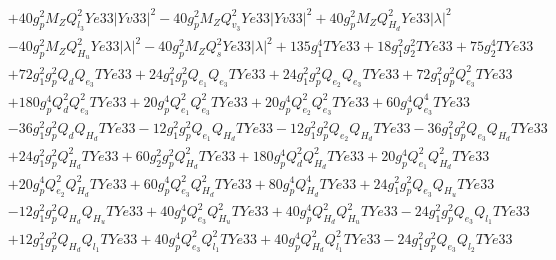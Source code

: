 \begin{align}
 &+40 g_{p}^{2} M_Z Q_{l_3}^{2} Ye33 |Yv33|^2 -40 g_{p}^{2} M_Z Q_{v_3}^{2} Ye33 |Yv33|^2 +40 g_{p}^{2} M_Z Q_{H_d}^{2} Ye33 |\lambda|^2 \nonumber \\ 
 &-40 g_{p}^{2} M_Z Q_{H_u}^{2} Ye33 |\lambda|^2 -40 g_{p}^{2} M_Z Q_{s}^{2} Ye33 |\lambda|^2 +135 g_{1}^{4} TYe33 +18 g_{1}^{2} g_{2}^{2} TYe33 +75 g_{2}^{4} TYe33 \nonumber \\ 
 &+72 g_{1}^{2} g_{p}^{2} Q_{d} Q_{e_3} TYe33 +24 g_{1}^{2} g_{p}^{2} Q_{e_{1}} Q_{e_3} TYe33 +24 g_{1}^{2} g_{p}^{2} Q_{e_{2}} Q_{e_3} TYe33 +72 g_{1}^{2} g_{p}^{2} Q_{e_3}^{2} TYe33 \nonumber \\ 
 &+180 g_{p}^{4} Q_{d}^{2} Q_{e_3}^{2} TYe33 +20 g_{p}^{4} Q_{e_{1}}^{2} Q_{e_3}^{2} TYe33 +20 g_{p}^{4} Q_{e_{2}}^{2} Q_{e_3}^{2} TYe33 +60 g_{p}^{4} Q_{e_3}^{4} TYe33 \nonumber \\ 
 &-36 g_{1}^{2} g_{p}^{2} Q_{d} Q_{H_d} TYe33 -12 g_{1}^{2} g_{p}^{2} Q_{e_{1}} Q_{H_d} TYe33 -12 g_{1}^{2} g_{p}^{2} Q_{e_{2}} Q_{H_d} TYe33 -36 g_{1}^{2} g_{p}^{2} Q_{e_3} Q_{H_d} TYe33 \nonumber \\ 
 &+24 g_{1}^{2} g_{p}^{2} Q_{H_d}^{2} TYe33 +60 g_{2}^{2} g_{p}^{2} Q_{H_d}^{2} TYe33 +180 g_{p}^{4} Q_{d}^{2} Q_{H_d}^{2} TYe33 +20 g_{p}^{4} Q_{e_{1}}^{2} Q_{H_d}^{2} TYe33 \nonumber \\ 
 &+20 g_{p}^{4} Q_{e_{2}}^{2} Q_{H_d}^{2} TYe33 +60 g_{p}^{4} Q_{e_3}^{2} Q_{H_d}^{2} TYe33 +80 g_{p}^{4} Q_{H_d}^{4} TYe33 +24 g_{1}^{2} g_{p}^{2} Q_{e_3} Q_{H_u} TYe33 \nonumber \\ 
 &-12 g_{1}^{2} g_{p}^{2} Q_{H_d} Q_{H_u} TYe33 +40 g_{p}^{4} Q_{e_3}^{2} Q_{H_u}^{2} TYe33 +40 g_{p}^{4} Q_{H_d}^{2} Q_{H_u}^{2} TYe33 -24 g_{1}^{2} g_{p}^{2} Q_{e_3} Q_{l_1} TYe33 \nonumber \\ 
 &+12 g_{1}^{2} g_{p}^{2} Q_{H_d} Q_{l_1} TYe33 +40 g_{p}^{4} Q_{e_3}^{2} Q_{l_1}^{2} TYe33 +40 g_{p}^{4} Q_{H_d}^{2} Q_{l_1}^{2} TYe33 -24 g_{1}^{2} g_{p}^{2} Q_{e_3} Q_{l_2} TYe33 \nonumber 
\end{align} 
